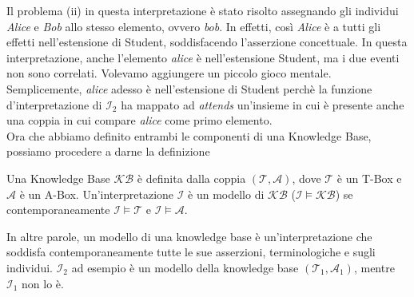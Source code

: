 Il problema (ii) in questa interpretazione è stato risolto assegnando gli individui \textit{Alice} e \textit{Bob} allo stesso elemento, ovvero \textit{bob}. In effetti, così \textit{Alice} è a tutti gli effetti nell'estensione di Student, soddisfacendo l'asserzione concettuale. In questa interpretazione, anche l'elemento \textit{alice} è nell'estensione Student, ma i due eventi non sono correlati. Volevamo aggiungere un piccolo gioco mentale. Semplicemente, \textit{alice} adesso è nell'estensione di Student perchè la funzione d'interpretazione di $\mathcal{I}_2$ ha mappato ad \textit{attends} un'insieme in cui è presente anche una coppia in cui compare \textit{alice} come primo elemento.
\\
Ora che abbiamo definito entrambi le componenti di una Knowledge Base, possiamo procedere a darne la definizione
\begin{definition}
	Una Knowledge Base $\mathcal{KB}$ è definita dalla coppia $(\mathcal{T}, \mathcal{A})$, dove $\mathcal{T}$ è un T-Box e $\mathcal{A}$ è un A-Box. Un’interpretazione $\mathcal{I}$ è un modello di $\mathcal{KB}$ ($\mathcal{I} \models \mathcal{KB}$) se contemporaneamente $\mathcal{I} \models \mathcal{T}$ e $\mathcal{I} \models \mathcal{A}$.
\end{definition}
\noindent
In altre parole, un modello di una knowledge base è un'interpretazione che soddisfa contemporaneamente tutte le sue asserzioni, terminologiche e sugli individui.  $\mathcal{I}_2$ ad esempio è un modello della knowledge base $(\mathcal{T}_1, \mathcal{A}_1)$, mentre  $\mathcal{I}_1$ non lo è.
